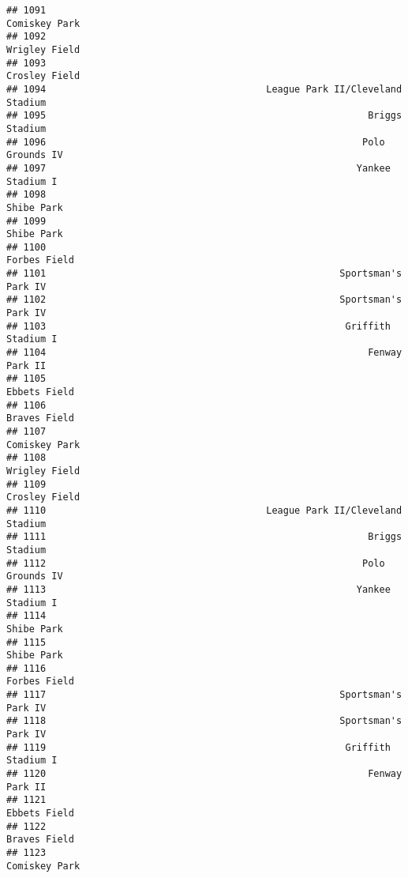 \documentclass[]{article}
\begin{document}
\begin{verbatim}
## 1091                                                          Comiskey Park
## 1092                                                          Wrigley Field
## 1093                                                          Crosley Field
## 1094                                       League Park II/Cleveland Stadium
## 1095                                                         Briggs Stadium
## 1096                                                        Polo Grounds IV
## 1097                                                       Yankee Stadium I
## 1098                                                             Shibe Park
## 1099                                                             Shibe Park
## 1100                                                           Forbes Field
## 1101                                                    Sportsman's Park IV
## 1102                                                    Sportsman's Park IV
## 1103                                                     Griffith Stadium I
## 1104                                                         Fenway Park II
## 1105                                                           Ebbets Field
## 1106                                                           Braves Field
## 1107                                                          Comiskey Park
## 1108                                                          Wrigley Field
## 1109                                                          Crosley Field
## 1110                                       League Park II/Cleveland Stadium
## 1111                                                         Briggs Stadium
## 1112                                                        Polo Grounds IV
## 1113                                                       Yankee Stadium I
## 1114                                                             Shibe Park
## 1115                                                             Shibe Park
## 1116                                                           Forbes Field
## 1117                                                    Sportsman's Park IV
## 1118                                                    Sportsman's Park IV
## 1119                                                     Griffith Stadium I
## 1120                                                         Fenway Park II
## 1121                                                           Ebbets Field
## 1122                                                           Braves Field
## 1123                                                          Comiskey Park

\end{verbatim}
\end{document}
